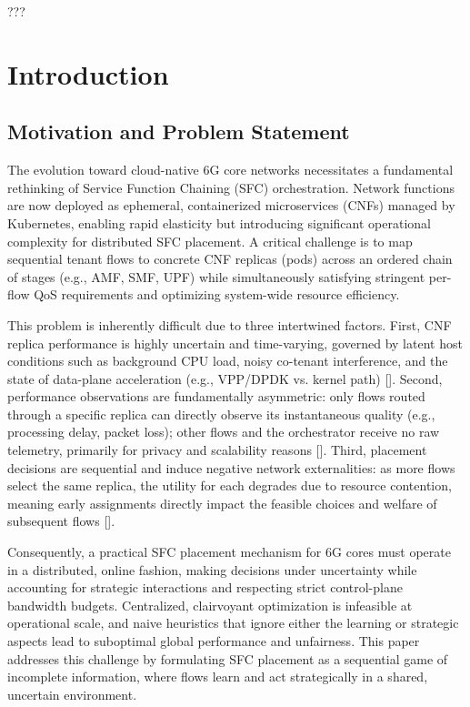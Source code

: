 \documentclass[journal]{IEEEtran}
\theoremstyle{plain}
\theoremstyle{definition}
\theoremstyle{remark}
\begin{document}
\begin{IEEEkeywords}
???
\end{IEEEkeywords}

\section{Introduction}\label{sec:intro}

\subsection{Motivation and Problem Statement}
\label{sec:intro_motivation}

The evolution toward cloud-native 6G core networks necessitates a fundamental rethinking of Service Function Chaining (SFC) orchestration. Network functions are now deployed as ephemeral, containerized microservices (CNFs) managed by Kubernetes, enabling rapid elasticity but introducing significant operational complexity for distributed SFC placement. A critical challenge is to map sequential tenant flows to concrete CNF replicas (pods) across an ordered chain of stages (e.g., AMF, SMF, UPF) while simultaneously satisfying stringent per-flow QoS requirements and optimizing system-wide resource efficiency.

This problem is inherently difficult due to three intertwined factors. First, CNF replica performance is highly uncertain and time-varying, governed by latent host conditions such as background CPU load, noisy co-tenant interference, and the state of data-plane acceleration (e.g., VPP/DPDK vs. kernel path) []. Second, performance observations are fundamentally asymmetric: only flows routed through a specific replica can directly observe its instantaneous quality (e.g., processing delay, packet loss); other flows and the orchestrator receive no raw telemetry, primarily for privacy and scalability reasons []. Third, placement decisions are sequential and induce negative network externalities: as more flows select the same replica, the utility for each degrades due to resource contention, meaning early assignments directly impact the feasible choices and welfare of subsequent flows [].

Consequently, a practical SFC placement mechanism for 6G cores must operate in a distributed, online fashion, making decisions under uncertainty while accounting for strategic interactions and respecting strict control-plane bandwidth budgets. Centralized, clairvoyant optimization is infeasible at operational scale, and naive heuristics that ignore either the learning or strategic aspects lead to suboptimal global performance and unfairness. This paper addresses this challenge by formulating SFC placement as a sequential game of incomplete information, where flows learn and act strategically in a shared, uncertain environment.
\end{document}
